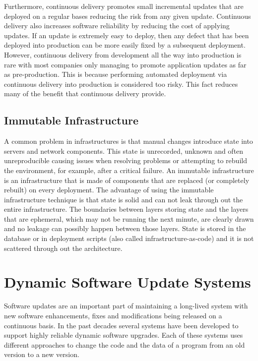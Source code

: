\documentclass[a4paper,11pt,twoside]{report}
\begin{document}
Furthermore, continuous delivery promotes small incremental updates that are deployed on a regular bases reducing the risk from any given update. Continuous delivery also increases software reliability by reducing the cost of applying updates. If an update is extremely easy to deploy, then any defect that has been deployed into production can be more easily fixed by a subsequent deployment. However, continuous delivery from development all the way into production is rare with most companies only managing to promote application updates as far as pre-production. This is because performing automated deployment via continuous delivery into production is considered too risky. This fact reduces many of the benefit that continuous delivery provide.

\subsection{Immutable Infrastructure}
 A common problem in infrastructures is that manual changes introduce state into servers and network components.  This state is unrecorded, unknown and often unreproducible causing issues when resolving problems or attempting to rebuild the environment, for example, after a critical failure.  An immutable infrastructure is an infrastructure that is made of components that are replaced (or completely rebuilt) on every deployment.  The advantage of using the immutable infrastructure technique is that state is solid and can not leak through out the entire infrastructure.  The boundaries between layers storing state and the layers that are ephemeral, which may not be running the next minute, are clearly drawn and no leakage can possibly happen between those layers. State is stored in the database or in deployment scripts (also called infrastructure-as-code) and it is not scattered through out the architecture. 

\section{Dynamic Software Update Systems} \label{DSU}
Software updates are an important part of maintaining a long-lived system with new software enhancements, fixes and modifications being released on a continuous basis. In the past decades several systems have been developed to support highly reliable dynamic software upgrades. Each of these systems uses different approaches to change the code and the data of a program from an old version to a new version. 
\end{document}
